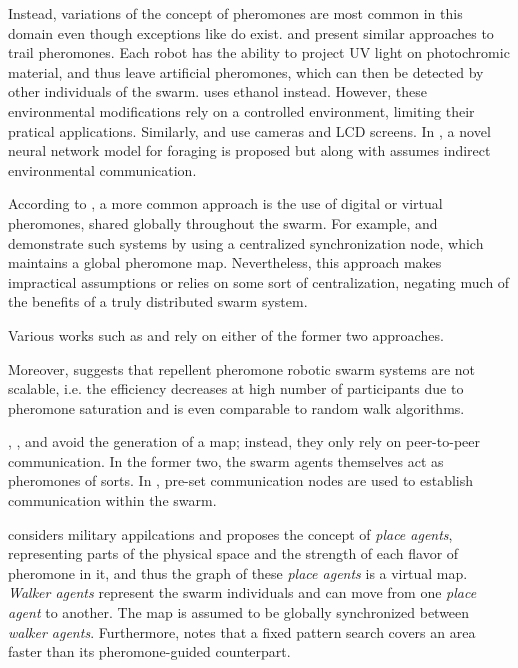 \par Instead, variations of the concept of pheromones are most common in this domain even though exceptions like \parencite{flint_cooperative_2002} do exist. \parencite{salman_phormica_2020} and \parencite{hutchison_antbots_2010} present similar approaches to trail pheromones. Each robot has the ability to project UV light on photochromic material, and thus leave artificial pheromones, which can then be detected by other individuals of the swarm. \parencite{fujisawa_designing_2014} uses ethanol instead. However, these environmental modifications rely on a controlled environment, limiting their pratical applications. Similarly, \parencite{arvin_cos_nodate} and \parencite{na_bio-inspired_2021} use cameras and LCD screens. In \parencite{song_novel_2020}, a novel neural network model for foraging is proposed but along with \parencite{calvo_bio-inspired_2011} assumes indirect environmental communication.
\par According to \parencite{hunt_testing_2019}, a more common approach is the use of digital or virtual pheromones, shared globally throughout the swarm. For example, \parencite{winkelstrater_virtual_2019} and \parencite{ravankar_bio-inspired_2016} demonstrate such systems by using a centralized synchronization node, which maintains a global pheromone map. Nevertheless, this approach makes impractical assumptions or relies on some sort of centralization, negating much of the benefits of a truly distributed swarm system. 
\par Various works such as \parencite{fossum_repellent_2014} and \parencite{schroeder_efficient_2017} rely on either of the former two approaches.
\par Moreover, \parencite{hunt_testing_2019} suggests that repellent pheromone robotic swarm systems are not scalable, i.e. the efficiency decreases at high number of participants due to pheromone saturation and is even comparable to random walk algorithms.
\par \parencite{payton_pheromone_2001}, \parencite{pearce_using_2006}, and \parencite{schmickl_trophallaxis_2006} avoid the generation of a map; instead, they only rely on peer-to-peer communication. In the former two, the swarm agents themselves act as pheromones of sorts. In \parencite{li_pheromone-inspired_2019}, pre-set communication nodes are used to establish communication within the swarm.
\par \parencite{hutchison_digital_2005} considers military appilcations and proposes the concept of \textit{place agents}, representing parts of the physical space and the strength of each flavor of pheromone in it, and thus the graph of these \textit{place agents} is a virtual map. \textit{Walker agents} represent the swarm individuals and can move from one \textit{place agent} to another. The map is assumed to be globally synchronized between \textit{walker agents}. Furthermore, \parencite{sauter_performance_2005} notes that a fixed pattern search covers an area faster than its pheromone-guided counterpart. 
